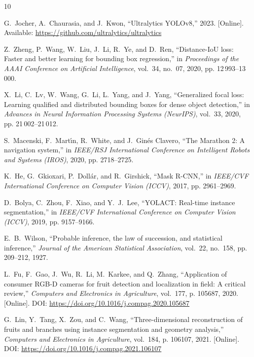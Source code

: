 \documentclass[12pt,a4paper]{article}
\begin{document}
\newpage
\begin{thebibliography}{10}

G.~Jocher, A.~Chaurasia, and J.~Kwon, ``Ultralytics YOLOv8,'' 2023. [Online]. Available: \url{https://github.com/ultralytics/ultralytics}

Z.~Zheng, P.~Wang, W.~Liu, J.~Li, R.~Ye, and D.~Ren, ``Distance-IoU loss: Faster and better learning for bounding box regression,'' in \textit{Proceedings of the AAAI Conference on Artificial Intelligence}, vol.~34, no.~07, 2020, pp. 12\,993--13\,000.

X.~Li, C.~Lv, W.~Wang, G.~Li, L.~Yang, and J.~Yang, ``Generalized focal loss: Learning qualified and distributed bounding boxes for dense object detection,'' in \textit{Advances in Neural Information Processing Systems (NeurIPS)}, vol.~33, 2020, pp. 21\,002--21\,012.

S.~Macenski, F.~Mart{\'\i}n, R.~White, and J.~Gin{\'e}s Clavero, ``The Marathon 2: A navigation system,'' in \textit{IEEE/RSJ International Conference on Intelligent Robots and Systems (IROS)}, 2020, pp. 2718--2725.

K.~He, G.~Gkioxari, P.~Doll{\'a}r, and R.~Girshick, ``Mask R-CNN,'' in \textit{IEEE/CVF International Conference on Computer Vision (ICCV)}, 2017, pp. 2961--2969.

D.~Bolya, C.~Zhou, F.~Xiao, and Y.~J.~Lee, ``YOLACT: Real-time instance segmentation,'' in \textit{IEEE/CVF International Conference on Computer Vision (ICCV)}, 2019, pp. 9157--9166.

E.~B.~Wilson, ``Probable inference, the law of succession, and statistical inference,'' \textit{Journal of the American Statistical Association}, vol.~22, no.~158, pp. 209--212, 1927.

L.~Fu, F.~Gao, J.~Wu, R.~Li, M.~Karkee, and Q.~Zhang, ``Application of consumer RGB-D cameras for fruit detection and localization in field: A critical review,'' \textit{Computers and Electronics in Agriculture}, vol.~177, p. 105687, 2020. [Online]. DOI: \url{https://doi.org/10.1016/j.compag.2020.105687}

G.~Lin, Y.~Tang, X.~Zou, and C.~Wang, ``Three-dimensional reconstruction of fruits and branches using instance segmentation and geometry analysis,'' \textit{Computers and Electronics in Agriculture}, vol.~184, p. 106107, 2021. [Online]. DOI: \url{https://doi.org/10.1016/j.compag.2021.106107}


\end{thebibliography}
\end{document}
